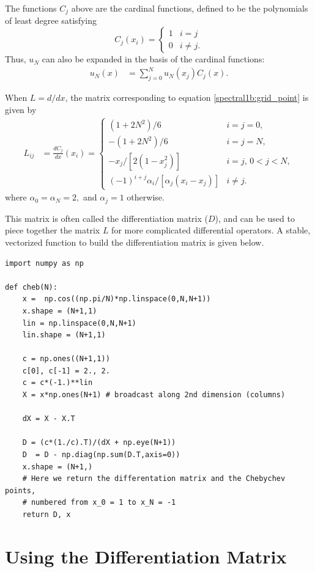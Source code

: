 The functions $C_j$ above are the cardinal functions, defined to be the polynomials of least degree satisfying
\begin{equation*}
C_j(x_i) = \begin{cases} 1 & i=j \\ 0 & i \not = j.
   \end{cases}
\end{equation*}
Thus, $u_N$ can also be expanded in the basis of the cardinal functions: 
\begin{align*}
	u_N(x) &= \sum_{j=0}^N u_N(x_j)C_j(x).
\end{align*}

When $L = d/dx$, the matrix corresponding to equation \eqref{spectral1b:grid_point} is given by 
\begin{align*}
L_{ij} &= \frac{dC_j}{dx}(x_i) = 
\begin{cases} (1+2N^2)/6 & i=j=0, \\ -(1+2N^2)/6 & i=j=N, \\
-x_j/[2(1-x_j^2)] & i=j, \, 0<j<N, \\ 
(-1)^{i+j}\alpha_i/[\alpha_j(x_i-x_j)] & i \not = j.
   \end{cases}
\end{align*}
where $\alpha_0 = \alpha_N = 2,$ and $\alpha_j = 1$ otherwise. 

This matrix is often called the differentiation matrix ($D$), and can be used to piece together the matrix $L$ for more complicated differential operators. 
A stable, vectorized function to build the differentiation matrix is given below. 


\begin{lstlisting}
import numpy as np

def cheb(N):
	x =  np.cos((np.pi/N)*np.linspace(0,N,N+1))
	x.shape = (N+1,1)
	lin = np.linspace(0,N,N+1)
	lin.shape = (N+1,1)
	
	c = np.ones((N+1,1))
	c[0], c[-1] = 2., 2.
	c = c*(-1.)**lin
	X = x*np.ones(N+1) # broadcast along 2nd dimension (columns)
	
	dX = X - X.T
	
	D = (c*(1./c).T)/(dX + np.eye(N+1))
	D  = D - np.diag(np.sum(D.T,axis=0))
	x.shape = (N+1,)
	# Here we return the differentation matrix and the Chebychev points, 
	# numbered from x_0 = 1 to x_N = -1
	return D, x

\end{lstlisting}



\section*{Using the Differentiation Matrix}


